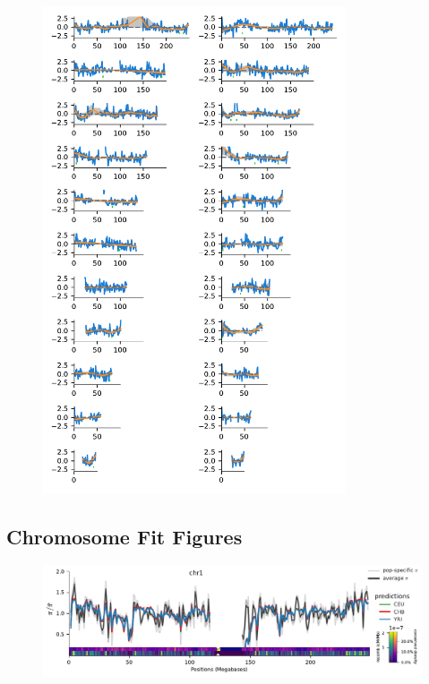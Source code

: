\documentclass[11pt]{article}
\begin{document}
\begin{figure}[!htb]
  \centering
  \includegraphics[width=0.8\textwidth]{figures/supplementary/spatial_residual.pdf}
  \label{suppfig:spatial-residuals}
\end{figure}


\clearpage

\subsection{Chromosome Fit Figures}
\label{supp:chrom-fit}

\begin{figure}[!htb]
  \centering
  \includegraphics[width=\textwidth]{figures/supplementary/pred_plot_chr1.pdf}
  \label{suppfig:fit-chr1}
\end{figure}
\end{document}
